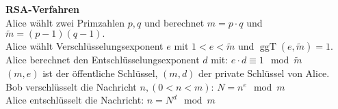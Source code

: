 \documentclass[a4paper]{article}
\newcommand{\ggT}{\operatorname{ggT}}
\newcommand{\Mod}[3]{#1\equiv#2\mod#3}
\begin{document}
\textbf{RSA-Verfahren} \\
Alice wählt zwei Primzahlen $p, q$ und berechnet $m = p \cdot q$ und $\tilde{m} = (p-1)  (q-1).$ \\
Alice wählt Verschlüsselungsexponent $e$ mit $1 < e < \tilde{m}$ und $\ggT(e,\tilde{m}) = 1$. \\
Alice berechnet den Entschlüsselungsexponent $d$ mit: $ \Mod{e \cdot d}{1}{\tilde{m}}$ \\
$(m,e)$ ist der öffentliche Schlüssel, $(m,d)$ der private Schlüssel von Alice. \\
Bob verschlüsselt die Nachricht $n, (0 < n < m)$: $N = n^e \mod m$ \\
Alice entschlüsselt die Nachricht: $n = N^d \mod m$








 

 


 


 



 
\end{document}
